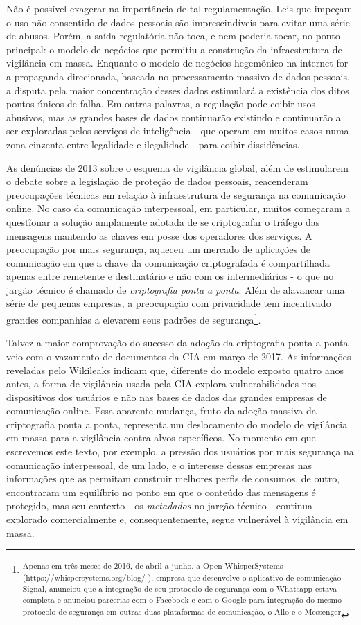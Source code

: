 Não é possível exagerar na importância de tal regulamentação. Leis que
impeçam o uso não consentido de dados pessoais são imprescindíveis para
evitar uma série de abusos. Porém, a saída regulatória não toca, e nem
poderia tocar, no ponto principal: o modelo de negócios que permitiu a
construção da infraestrutura de vigilância em massa. Enquanto o modelo
de negócios hegemônico na internet for a propaganda direcionada, baseada
no processamento massivo de dados pessoais, a disputa pela maior
concentração desses dados estimulará a existência dos ditos pontos
únicos de falha. Em outras palavras, a regulação pode coibir usos
abusivos, mas as grandes bases de dados continuarão existindo e
continuarão a ser exploradas pelos serviços de inteligência - que operam
em muitos casos numa zona cinzenta entre legalidade e ilegalidade - para
coibir dissidências.

As denúncias de 2013 sobre o esquema de vigilância global, além de
estimularem o debate sobre a legislação de proteção de dados pessoais,
reacenderam preocupações técnicas em relação à infraestrutura de
segurança na comunicação online. No caso da comunicação interpessoal, em
particular, muitos começaram a questĩonar a solução amplamente adotada
de se criptografar o tráfego das mensagens mantendo as chaves em posse
dos operadores dos serviços. A preocupação por mais segurança, aqueceu
um mercado de aplicações de comunicação em que a chave da comunicação
criptografada é compartilhada apenas entre remetente e destinatário e
não com os intermediários - o que no jargão técnico é chamado de
\emph{criptografia ponta a ponta}. Além de alavancar uma série de
pequenas empresas, a preocupação com privacidade tem incentivado grandes
companhias a elevarem seus padrões de segurança\footnote{\textsuperscript{Apenas
  em três meses de 2016, de abril a junho, a Open WhisperSystems
  (https://whispersystems.org/blog/ ), empresa que desenvolve o
  aplicativo de comunicação Signal, anunciou que a integração de seu
  protocolo de segurança com o Whatsapp estava completa e anunciou
  parcerias com o Facebook e com o Google para integração do mesmo
  protocolo de segurança em outras duas plataformas de comunicação, o
  Allo e o Messenger }}.

Talvez a maior comprovação do sucesso da adoção da criptografia ponta a
ponta veio com o vazamento de documentos da CIA em março de 2017. As
informações reveladas pelo Wikileaks indicam que, diferente do modelo
exposto quatro anos antes, a forma de vigilância usada pela CIA explora
vulnerabilidades nos dispositivos dos usuários e não nas bases de dados
das grandes empresas de comunicação online. Essa aparente mudança, fruto
da adoção massiva da criptografia ponta a ponta, representa um
deslocamento do modelo de vigilância em massa para a vigilância contra
alvos específicos. No momento em que escrevemos este texto, por exemplo,
a pressão dos usuários por mais segurança na comunicação interpessoal,
de um lado, e o interesse dessas empresas nas informações que as
permitam construir melhores perfis de consumos, de outro, encontraram um
equilíbrio no ponto em que o conteúdo das mensagens é protegido, mas seu
contexto - os \emph{metadados} no jargão técnico - continua explorado
comercialmente e, consequentemente, segue vulnerável à vigilância em
massa.

